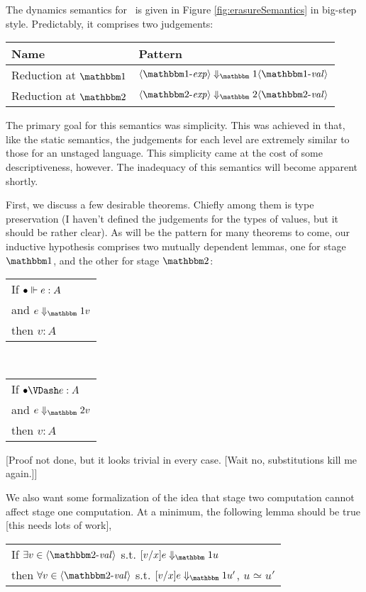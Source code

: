 \documentclass{article}
\begin{document}
The dynamics semantics for \ellStaged~is given in Figure \ref{fig:erasureSemantics} in big-step style.  Predictably, it comprises two judgements:

\begin{center}
\begin{tabular}{|l|l|} \hline
Name & Pattern \\ \hline
Reduction at $\bbone$ & $\reduceone{\expro}{\valo}$ \\  \hline
Reduction at $\bbtwo$ & $\reducetwo{\exprt}{\valt}$ \\ \hline
\end{tabular}
\end{center}

The primary goal for this semantics was simplicity.  This was achieved in that, like the static semantics, the judgements for each level are extremely similar to those for an unstaged language.  This simplicity came at the cost of some descriptiveness, however.  The inadequacy of this semantics will become apparent shortly.

First, we discuss a few desirable theorems.  Chiefly among them is type preservation (I haven't defined the judgements for the types of values, but it should be rather clear).  As will be the pattern for many theorems to come, our inductive hypothesis comprises two mutually dependent lemmas, one for stage $\bbone$, and the other for stage $\bbtwo$:
\begin{center}
\begin{tabular}{l}
If $\typesone [\emptyC]{e}{A}$ \\
and $\reduceone{e}{v}$ \\
then $v : A$
\end{tabular}
~~~
\begin{tabular}{l}
If $\typestwo [\emptyC]{e}{A}$ \\
and $\reducetwo{e}{v}$ \\
then $v : A$
\end{tabular}
\end{center}
[Proof not done, but it looks trivial in every case. [Wait no, substitutions kill me again.]]

We also want some formalization of the idea that stage two computation cannot affect stage one computation.  At a minimum, the following lemma should be true [this needs lots of work],

\begin{center}
\begin{tabular}{l}
If $\exists v\in \valt$ s.t. $\reduceone {[v/x]e}{u}$ \\
then $\forall v\in \valt$ s.t. $\reduceone {[v/x]e}{u'}$, $u \simeq u'$
\end{tabular}
\end{center}
\end{document}
